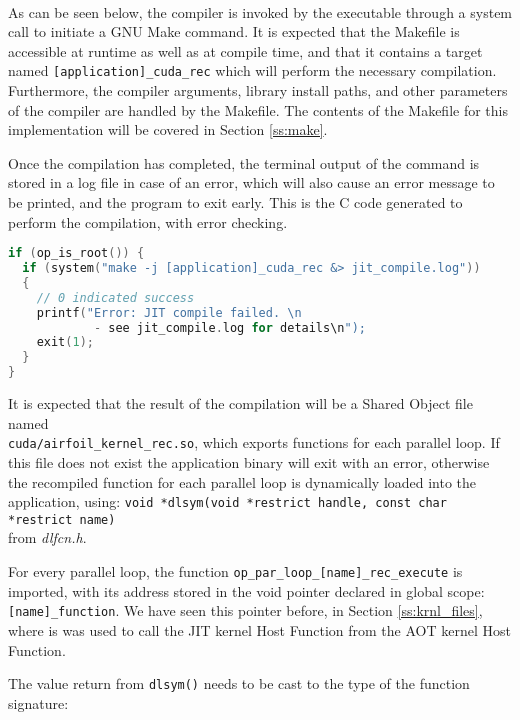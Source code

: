 \\
As can be seen below, the compiler is invoked by the executable through a system call to initiate a GNU Make \cite{make} command. It is expected that the Makefile is accessible at runtime as well as at compile time, and that it contains a target named \verb|[application]_cuda_rec| which will perform the necessary compilation. Furthermore, the compiler arguments, library install paths, and other parameters of the compiler are handled by the Makefile. The contents of the Makefile for this implementation will be covered in Section \ref{ss:make}.\par
Once the compilation has completed, the terminal output of the command is stored in a log file in case of an error, which will also cause an error message to be printed, and the program to exit early.
\clearpage
\noindent This is the C code generated to perform the compilation, with error checking.
\vspace{1em}
\begin{lstlisting}[backgroundcolor=\color{red!20}, language=C]
if (op_is_root()) {
  if (system("make -j [application]_cuda_rec &> jit_compile.log"))
  {
    // 0 indicated success
    printf("Error: JIT compile failed. \n
            - see jit_compile.log for details\n");
    exit(1);
  }
}
\end{lstlisting}
\par
\noindent It is expected that the result of the compilation will be a Shared Object file named\\ \verb|cuda/airfoil_kernel_rec.so|, which exports functions for each parallel loop. If this file does not exist the application binary will exit with an error, otherwise the recompiled function for each parallel loop is dynamically loaded into the application, using: \verb|void *dlsym(void *restrict handle, const char *restrict name)|\\ from \textit{dlfcn.h}.
\par
\noindent For every parallel loop, the function \verb|op_par_loop_[name]_rec_execute| is imported, with its address stored in the void pointer declared in global scope: \verb|[name]_function|. We have seen this pointer before, in Section \ref{ss:krnl_files}, where is was used to call the JIT kernel Host Function from the AOT kernel Host Function.
\par
The value return from \verb|dlsym()| needs to be cast to the type of the function signature: \\
